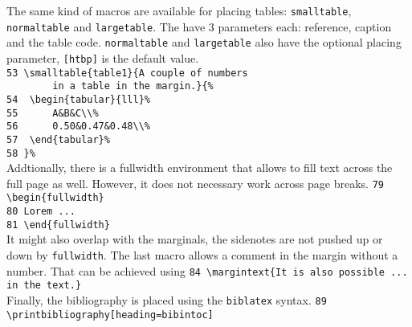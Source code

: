 \documentclass[]{caesar_book}
\begin{document}
The same kind of macros are available for placing tables: \texttt{smalltable}, \texttt{normaltable} and \texttt{largetable}. The have 3 parameters each: reference, caption and the table code. \texttt{normaltable} and \texttt{largetable} also have the optional placing parameter, \texttt{[htbp]} is the default value.\\
\verb+53 \smalltable{table1}{A couple of numbers+\\
\verb+        in a table in the margin.}{%+\\
\verb+54  \begin{tabular}{lll}%+\\
\verb+55      A&B&C\\%+\\
\verb+56      0.50&0.47&0.48\\%+\\
\verb+57  \end{tabular}%+\\
\verb+58 }%+\\
Addtionally, there is a fullwidth environment that allows to fill text across the full page as well. However, it does not necessary work across page breaks.
\verb+79 \begin{fullwidth}+\\
\verb+80 Lorem ...+\\
\verb+81 \end{fullwidth}+\\
It might also overlap with the marginals, the sidenotes are not pushed up or down by \texttt{fullwidth}. 
The last macro allows a comment in the margin without a number. That can be achieved using
\verb+84 \margintext{It is also possible ... in the text.}+\\
Finally, the bibliography is placed using the \texttt{biblatex} syntax.
\verb+89 \printbibliography[heading=bibintoc]+\\
\end{document}
